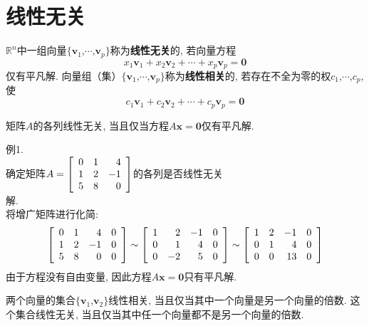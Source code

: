 \section{线性无关}
\begin{definition}
$\mathbb{R}^n$中一组向量$\{\bm{v}_1$,$\cdots$,$\bm{v}_p\}$称为\textbf{线性无关}的, 若向量方程
\[x_1\bm{v}_1+x_2\bm{v}_2+\cdots+x_p\bm{v}_p=\bm{0}\]
仅有平凡解. 向量组（集）$\{\bm{v}_1$,$\cdots$,$\bm{v}_p\}$称为\textbf{线性相关}的, 若存在不全为零的权$c_1$,$\cdots$,$c_p$, 使
\[c_1\bm{v}_1+c_2\bm{v}_2+\cdots+c_p\bm{v}_p=\bm{0}\]
\end{definition}\vspace{2ex}

\begin{law}
矩阵$A$的各列线性无关, 当且仅当方程$A\bm{x}=\bm{0}$仅有平凡解.
\end{law}\vspace{2ex}

例1.\\
确定矩阵$\displaystyle A=\left[\begin{array}{r r r}
    0 & 1 & 4\\
    1 & 2 & -1\\
    5 & 8 & 0
\end{array}\right]$的各列是否线性无关\\
解.\\
将增广矩阵进行化简:\\
\[
\left[\begin{array}{r r r r}
    0 & 1 & 4 & 0\\
    1 & 2 & -1 & 0\\
    5 & 8 & 0 & 0
\end{array}\right]\sim\left[\begin{array}{r r r r}
    1 & 2 & -1 & 0\\
    0 & 1 & 4 & 0\\
    0 & -2 & 5 & 0
\end{array}\right]\sim\left[\begin{array}{r r r r}
    1 & 2 & -1 & 0\\
    0 & 1 & 4 & 0\\
    0 & 0 & 13 & 0
\end{array}\right]
\]
由于方程没有自由变量, 因此方程$A\bm{x}=\bm{0}$只有平凡解.\\[2ex]

\begin{law}
两个向量的集合$\{\bm{v}_1$,$\bm{v}_2\}$线性相关, 当且仅当其中一个向量是另一个向量的倍数. 这个集合线性无关, 当且仅当其中任一个向量都不是另一个向量的倍数.
\end{law}\vspace{4ex}

